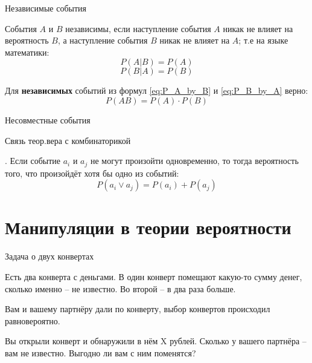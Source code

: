 \begin{frame}{Независимые события}
	
События $A$ и $B$ независимы, если 
наступление события $A$ никак не влияет на вероятность $B$,
а наступление события $B$ никак не влияет на $A$;
т.е на языке математики:
\begin{equation*}
P(A|B) = P(A)
\end{equation*}
\begin{equation*}
P(B|A) = P(B)
\end{equation*}

Для \textbf{независимых} событий из формул 
\eqref{eq:P_A_by_B} и \eqref{eq:P_B_by_A}
верно:
\begin{equation}
P(AB) = P(A) \cdot P(B)
\end{equation}


\end{frame}

\begin{frame}{Несовместные события}
\end{frame}


\begin{frame}{Связь теор.вера с комбинаторикой}

 . Если событие $a_i$ и $a_j$ не могут произойти одновременно, 
 то тогда вероятность того, что произойдёт хотя бы одно из событий:
 \begin{equation}
 P(a_i \vee a_j) = P(a_i) + P(a_j)
 \end{equation}


\textbf{}

\end{frame}





\section{Манипуляции в теории вероятности}\label{section:manipulations}
\begin{frame}{Задача о двух конвертах}

Есть два конверта с деньгами.
В один конверт помещают какую-то сумму денег,
сколько именно -- не известно. 
Во второй -- в два раза больше.

Вам и вашему партнёру дали по конверту, 
выбор конвертов происходил равновероятно.

Вы открыли конверт и обнаружили в нём X рублей.
Сколько у вашего партнёра -- вам не известно.
Выгодно ли вам с ним поменятся?


\end{frame}

